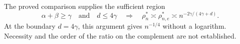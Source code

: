 The proved comparison supplies the sufficient region
\[
 \alpha+\beta\ge\gamma\quad\text{and}\quad d\le4\gamma
 \quad\Longrightarrow\quad
 \rho_n^*\asymp\rho_{n,e}^*\asymp n^{-2\gamma/(4\gamma+d)}.
\]
At the boundary \(d=4\gamma\), this argument gives \(n^{-1/4}\) without a logarithm. Necessity and the order of the ratio on the complement are not established.
